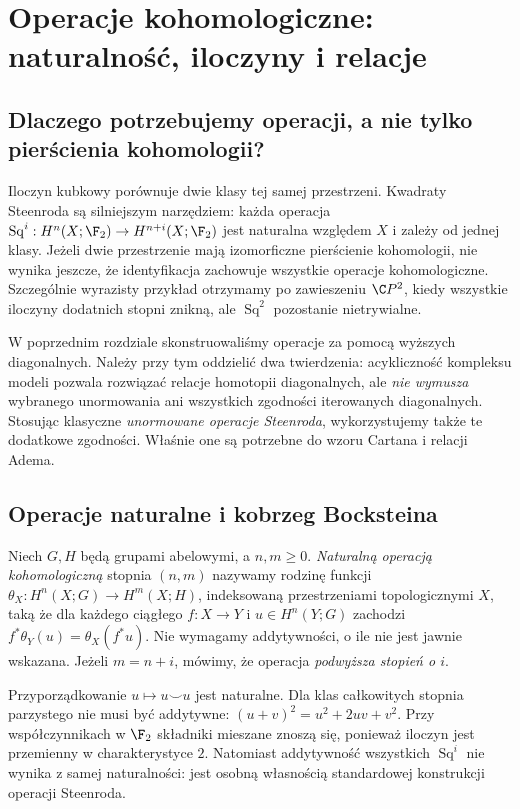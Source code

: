 \chapter{Operacje kohomologiczne: naturalność, iloczyny i relacje}
\label{ch:operacje-v8}

\section{Dlaczego potrzebujemy operacji, a nie tylko pierścienia kohomologii?}
Iloczyn kubkowy porównuje dwie klasy tej samej przestrzeni. Kwadraty
Steenroda są silniejszym narzędziem: każda operacja
$\operatorname{Sq}^i:H^n(X;\F_2)\to H^{n+i}(X;\F_2)$
jest naturalna względem $X$ i zależy od jednej klasy.
Jeżeli dwie przestrzenie mają izomorficzne pierścienie kohomologii,
nie wynika jeszcze, że identyfikacja zachowuje wszystkie operacje
kohomologiczne. Szczególnie wyrazisty przykład otrzymamy po zawieszeniu
$\C P^2$, kiedy wszystkie iloczyny dodatnich stopni znikną, ale
$\operatorname{Sq}^2$ pozostanie nietrywialne.

W poprzednim rozdziale skonstruowaliśmy operacje za pomocą wyższych
diagonalnych. Należy przy tym oddzielić dwa twierdzenia:
acykliczność kompleksu modeli pozwala rozwiązać relacje homotopii
diagonalnych, ale \emph{nie wymusza} wybranego unormowania ani
wszystkich zgodności iterowanych diagonalnych. Stosując klasyczne
\emph{unormowane operacje Steenroda}, wykorzystujemy także te dodatkowe
zgodności. Właśnie one są potrzebne do wzoru Cartana i relacji Adema.

\section{Operacje naturalne i kobrzeg Bocksteina}
\begin{definicja}
Niech $G,H$ będą grupami abelowymi, a $n,m\ge0$.
\emph{Naturalną operacją kohomologiczną} stopnia $(n,m)$ nazywamy
rodzinę funkcji
$\theta_X:H^n(X;G)\to H^m(X;H)$, indeksowaną
przestrzeniami topologicznymi $X$, taką że dla każdego ciągłego
$f:X\to Y$ i $u\in H^n(Y;G)$ zachodzi
$f^*\theta_Y(u)=\theta_X(f^*u)$.
Nie wymagamy addytywności, o ile nie jest jawnie wskazana.
Jeżeli $m=n+i$, mówimy, że operacja \emph{podwyższa stopień o $i$}.
\end{definicja}

\begin{przyklad}
Przyporządkowanie $u\mapsto u\smile u$ jest naturalne. Dla klas
całkowitych stopnia parzystego nie musi być addytywne:
$(u+v)^2=u^2+2uv+v^2$. Przy współczynnikach w $\F_2$ składniki mieszane
znoszą się, ponieważ iloczyn jest przemienny w charakterystyce $2$.
Natomiast addytywność wszystkich $\operatorname{Sq}^i$
nie wynika z samej naturalności: jest osobną własnością
standardowej konstrukcji operacji Steenroda.
\end{przyklad}

